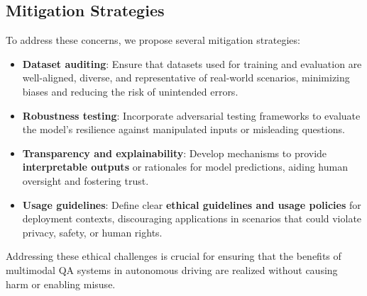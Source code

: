 \documentclass{article} %
\begin{document}
\subsection*{Mitigation Strategies}

To address these concerns, we propose several mitigation strategies:

\begin{itemize}
    \item \textbf{Dataset auditing}: Ensure that datasets used for training and evaluation are well-aligned, diverse, and representative of real-world scenarios, minimizing biases and reducing the risk of unintended errors.
    \item \textbf{Robustness testing}: Incorporate adversarial testing frameworks to evaluate the model's resilience against manipulated inputs or misleading questions.
    \item \textbf{Transparency and explainability}: Develop mechanisms to provide \textbf{interpretable outputs} or rationales for model predictions, aiding human oversight and fostering trust.
    \item \textbf{Usage guidelines}: Define clear \textbf{ethical guidelines and usage policies} for deployment contexts, discouraging applications in scenarios that could violate privacy, safety, or human rights.
\end{itemize}

Addressing these ethical challenges is crucial for ensuring that the benefits of multimodal QA systems in autonomous driving are realized without causing harm or enabling misuse.

\newpage




\end{document}
